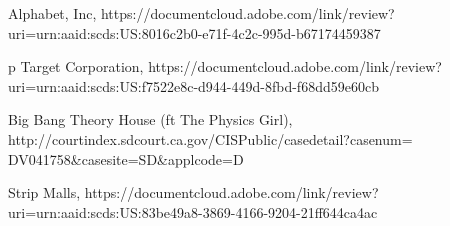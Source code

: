 \documentclass[a4paper]{arthur-letter}
\begin{document}
\begin{thebibliography}{}

Alphabet, Inc, https://documentcloud.adobe.com/link/review?uri=urn:aaid:scds:US:8016c2b0-e71f-4c2c-995d-b67174459387

p
Target Corporation, https://documentcloud.adobe.com/link/review?uri=urn:aaid:scds:US:f7522e8c-d944-449d-8fbd-f68dd59e60cb

Big Bang Theory House (ft The Physics Girl), http://courtindex.sdcourt.ca.gov/CISPublic/casedetail?casenum= DV041758\&casesite=SD\&applcode=D

Strip Malls, https://documentcloud.adobe.com/link/review?uri=urn:aaid:scds:US:83be49a8-3869-4166-9204-21ff644ca4ac

\end{thebibliography}
\end{document}
